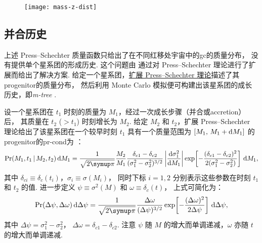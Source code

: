 \begin{figure}[htp]
  \centering
  \texttt{[image: mass-z-dist]}
  \label{fig:m-z-dist}
\end{figure}

\subsection{并合历史}
\label{sec:merging-history}

上述 Press--Schechter 质量函数只给出了在不同红移处宇宙中的\ac{gc}的质量分布，
没有提供单个星系团的形成历史.
这个问题由  通过对 Press--Schechter
理论进行了扩展而给出了解决方案.
给定一个星系团，\uline{扩展 Press--Schechter 理论}描述了其\ac{progenitor}的质量分布，
然后利用 Monte Carlo 模拟便可构建出该星系团的成长历史，即\emph{\acf{m-tree}}
\cite{lacey1993,randall2002}.

设一个星系团在 $t_1$ 时刻的质量为 $M_1$，经过一次成长步骤（并合或\ac{accretion}）后，
其质量在 $t_2$ ($> t_1$) 时刻增长为 $M_2$.
给定 $M_2$ 和 $t_2$，扩展 Press--Schechter 理论给出了该星系团在一个较早时刻 $t_1$
具有一个质量范围为 $[M_1,\, M_1+\mathrm{d}M_1]$ 的\ac{progenitor}的\ac{pr-cond}为
\cite{lacey1993,randall2002}：
\begin{equation}
  \label{eq:eps-condprob}
  \R{Pr}(M_1, t_1 \,|\, M_2, t_2) \,\D{M_1} =
    \frac{1}{\sqrt{2\Cpi}} \frac{M_2}{M_1}
    \frac{\delta_{c1} - \delta_{c2}}{(\sigma_1^2 - \sigma_2^2)^{3/2}}
    \left| \diff{\sigma_1^2}{M_1} \right|
    \exp \!\left[ -\frac{(\delta_{c1} - \delta_{c2})^2}
      {2(\sigma_1^2 - \sigma_2^2)} \right] \,\D{M_1} ,
\end{equation}
其中
$\delta_{ci} \equiv \delta_c(t_i)$，$\sigma_i \equiv \sigma(M_i)$，
同时下标 $i = 1, 2$ 分别表示这些参数在时刻 $t_1$ 和 $t_2$ 的值.
进一步定义 $\psi \equiv \sigma^2(M)$ 和 $\omega \equiv \delta_c(t)$，
上式可简化为：
\begin{equation}
  \label{eq:eps-condprob2}
  \R{Pr}(\Delta\psi, \Delta\omega) \,\D{\Delta\psi} =
    \frac{1}{\sqrt{2\Cpi}} \frac{\Delta\omega}{(\Delta\psi)^{3/2}}
    \exp \!\left[ -\frac{(\Delta\omega)^2}{2 \Delta\psi} \right]
    \,\D{\Delta\psi} ,
\end{equation}
其中
$\Delta\psi = \sigma_1^2 - \sigma_2^2$，
$\Delta\omega = \delta_{c1} - \delta_{c2}$.
注意 $\psi$ 随 $M$ 的增大而单调递减，$\omega$ 亦随 $t$ 的增大而单调递减.

